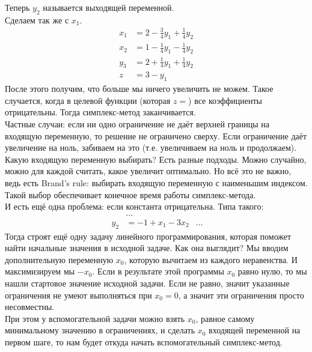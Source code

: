 \documentclass{article}
\begin{document}
    Теперь $y_2$ называется выходящей переменной.\\
    Сделаем так же с $x_1$.
    \[
    \begin{aligned}
        x_1&=2-\frac34y_1+\frac14y_2\\
        x_2&=1-\frac14y_1-\frac14y_2\\
        y_3&=2+\frac14y_1+\frac14y_2\\
        z&=3-y_1
    \end{aligned}
    \]
    После этого получим, что больше мы ничего увеличить не можем. Такое случается, когда в целевой функции (которая $z=$) все коэффициенты отрицательны. Тогда симплекс-метод заканчивается.\\
    Частные случаи: если ни одно ограничение не даёт верхней границы на входящую переменную, то решение не ограничено сверху. Если ограничение даёт увеличение на ноль, забиваем на это (т.е. увеличиваем на ноль и продолжаем).\\
    Какую входящую переменную выбирать? Есть разные подходы. Можно случайно, можно для каждой считать, какое увеличит оптимально. Но всё это не важно, ведь есть Brand's rule: выбирать входящую переменную с наименьшим индексом. Такой выбор обеспечивает конечное время работы симплекс-метода.\\
    И есть ещё одна проблема: если константа отрицательна. Типа такого:
    \[
    \begin{aligned}
        &...\\\
        y_2&=-1+x_1-3x_2
        &...
    \end{aligned}
    \]
    Тогда строят ещё одну задачу линейного программирования, которая поможет найти начальные значения в исходной задаче. Как она выглядит? Мы вводим дополнительную переменную $x_0$, которую вычитаем из каждого неравенства. И максимизируем мы $-x_0$. Если в результате этой программы $x_0$ равно нулю, то мы нашли стартовое значение исходной задачи. Если не равно, значит указанные ограничения не умеют выполняться при $x_0=0$, а значит эти ограничения просто несовместны.\\
    При этом у вспомогательной задачи можно взять $x_0$, равное самому минимальному значению в ограничениях, и сделать $x_0$ входящей переменной на первом шаге, то нам будет откуда начать вспомогательный симплекс-метод.
\end{document}
